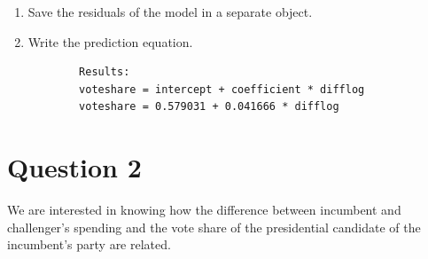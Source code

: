 \documentclass[12pt,letterpaper]{article}
\begin{document}
\begin{enumerate}
		\item Save the residuals of the model in a separate object.
		
		  
		
		\item Write the prediction equation.
		
		\begin{verbatim} 
		Results: 
		voteshare = intercept + coefficient * difflog
		voteshare = 0.579031 + 0.041666 * difflog
		\end{verbatim}
		
	\end{enumerate}
	
\newpage

\section*{Question 2}
\noindent We are interested in knowing how the difference between incumbent and challenger's spending and the vote share of the presidential candidate of the incumbent's party are related.	\vspace{.25cm}
\end{document}
